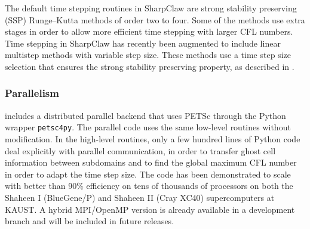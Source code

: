 The default time stepping routines in SharpClaw are strong stability
preserving (SSP) Runge--Kutta methods of order two to four.
Some of the methods use extra stages in order to allow more efficient
time stepping with larger CFL numbers.
Time stepping in SharpClaw has recently been augmented to include 
linear multistep methods with variable step size.  These methods use
a time step size selection that ensures the strong stability preserving
property, as described in \cite{ssp_lmm_vss}.

\subsubsection{Parallelism}
\pyclaw includes a distributed parallel backend that uses PETSc through
the Python wrapper {\tt petsc4py}.  The parallel code uses the same low-level
routines without modification.  In the high-level routines, only a few
hundred lines of Python code deal explicitly with parallel communication,
in order to transfer ghost cell information between subdomains and to
find the global maximum CFL number in order to adapt the time step
size.  The code has been demonstrated to scale with better than 90\%
efficiency on tens of thousands of processors on both the Shaheen I
(BlueGene/P) and Shaheen II (Cray XC40) supercomputers at KAUST.
A hybrid MPI/OpenMP version is already available in a development branch
and will be included in future releases.
